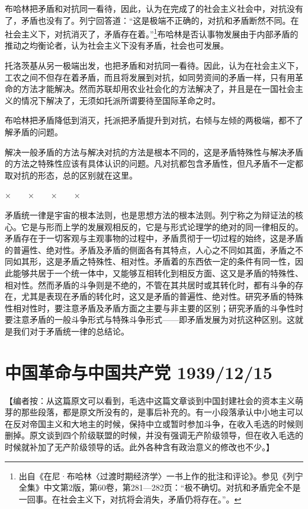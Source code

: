 \documentclass[UTF8, 12pt, a4paper]{ctexrep}
\begin{document}
布哈林把矛盾和对抗同一看待，因此，认为在完成了的社会主义社会中，对抗没有了，矛盾也没有了。列宁回答道：“这是极端不正确的，对抗和矛盾断然不同。在社会主义下，对抗消灭了，矛盾存在着。”\footnote{出自《在尼·布哈林〈过渡时期经济学〉一书上作的批注和评论》。参见《列宁全集》中文第2版，第60卷，第281—282页：“极不确切。对抗和矛盾完全不是一回事。在社会主义下，对抗将会消失，矛盾仍将存在。”。}布哈林是否认事物发展由于内部矛盾的推动之均衡论者，认为社会主义下没有矛盾，社会也可发展。

托洛茨基从另一极端出发，也把矛盾和对抗同一看待。因此，认为在社会主义下，工农之间不但存在着矛盾，而且将发展到对抗，如同劳资间的矛盾一样，只有用革命的方法才能解决。然而苏联却用农业社会化的方法解决了，并且是在一国社会主义的情况下解决了，无须如托派所谓要待至国际革命之时。

布哈林把矛盾降低到消灭，托派把矛盾提升到对抗，右倾与左倾的两极端，都不了解矛盾的问题。

解决一般矛盾的方法与解决对抗的方法是根本不同的，这是矛盾特殊性与解决矛盾的方法之特殊性应该有具体认识的问题。凡对抗都包含矛盾性，但凡矛盾不一定都取对抗的形态，总的区别就在这里。

×　　×　　×　　×

矛盾统一律是宇宙的根本法则，也是思想方法的根本法则。列宁称之为辩证法的核心。它是与形而上学的发展观相反的，它是与形式论理学的绝对的同一律相反的。矛盾存在于一切客观与主观事物的过程中，矛盾贯彻于一切过程的始终，这是矛盾的普遍性、绝对性。矛盾及矛盾的侧面各有其特点，人心之不同如其面，矛盾之不同如其形，这是矛盾之特殊性、相对性。矛盾着的东西依一定的条件有同一性，因此能够共居于一个统一体中，又能够互相转化到相反方面、这又是矛盾的特殊性、相对性。然而矛盾的斗争则是不绝的，不管在其共居时或其转化时，都有斗争的存在，尤其是表现在矛盾的转化时，这又是矛盾的普遍性、绝对性。研究矛盾的特殊性相对性时，要注意矛盾及矛盾方面之主要与非主要的区别；研究矛盾的斗争性时要注意矛盾的一般斗争形式与特殊斗争形式——即矛盾发展为对抗这种区别。这就是我们对于矛盾统一律的总结论。

\section{中国革命与中国共产党 1939/12/15}

【编者按：从这篇原文可以看到，毛选中这篇文章谈到中国封建社会的资本主义萌芽的那些段落，都是原文所没有的，是事后补充的。有一小段落承认中小地主可以在反对帝国主义和大地主的时候，保持中立或暂时参加斗争，在收入毛选的时候则删掉。原文谈到四个阶级联盟的时候，并没有强调无产阶级领导，但在收入毛选的时候就补加了无产阶级领导的话。此外各种含有政治意义的修改也不少。】
\end{document}
